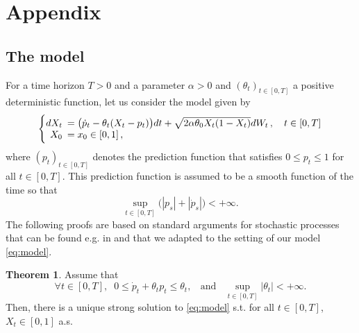 \documentclass[11pt]{article}
\theoremstyle{definition}
\newtheorem{Thm}[Def]{Theorem}
\begin{document}
\section{Appendix} \label{Appendix}

\subsection{The model}
For a time horizon $T>0$ and  a parameter $\alpha > 0$ and $(\theta_t)_{t\in[0,T]}$ a positive deterministic  function,  let us consider the model  given by
\begin{equation}
  \left\{
  \begin{array}{@{}rl@{}}
    dX_t \!\!\!&= \big(\dot p_t - \theta_t (X_t-p_t)  \big)dt  +\sqrt{2 \alpha \theta_0 X_t (1-X_t)} dW_t\,, \quad t\in[0,T] \\
   X_0  \!\!\!&=  x_0\in [0,1] \,,
 \end{array}\right.  \label{eq:model}
\end{equation}
where $(p_t)_{t\in[0,T]}$ denotes the prediction function that satisfies $0\le p_t\le 1$ for all $t\in[0,T]$. This prediction function is assumed to be a smooth function of the time so that 
$$\sup_{t\in[0,T]}\bigl( |p_s| + |\dot p_s|\big) <+\infty .$$
The following proofs are based on standard arguments for stochastic processes that can be found e.g. in \cite{Alf} and \cite{KarShr} that we adapted to the setting of our model \eqref{eq:model}.
\begin{Thm}\label{thm:exun}
Assume that    
\begin{equation}\label{Assumption:1}
\forall  t\in[0,T],\;\; 0\le \dot p_t +\theta_tp_t\le \theta_t, \;\;\mbox{ and }\;\;
\sup_{t\in[0,T]}|\theta_t|<+\infty\tag{A}. 
\end{equation}
Then, there is a unique strong solution to \eqref{eq:model} s.t.  for all $t\in[0,T]$, $X_t\in[0,1]$ a.s.
\end{Thm}
\end{document}
